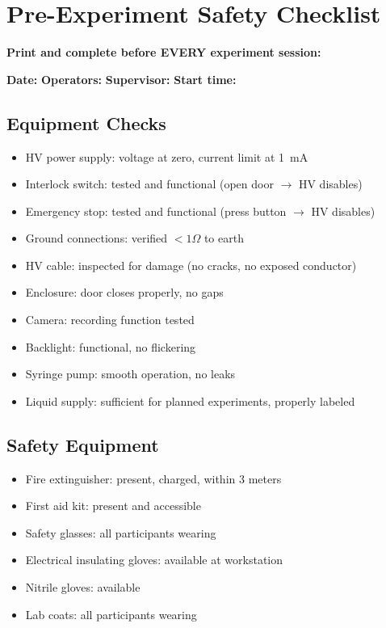 \documentclass[11pt]{article}
\begin{document}
\section{Pre-Experiment Safety Checklist}

\textbf{Print and complete before EVERY experiment session:}

\vspace{0.5cm}

\noindent\textbf{Date:} \underline{\hspace{3cm}}  
\textbf{Operators:} \underline{\hspace{10cm}}  
\textbf{Supervisor:} \underline{\hspace{4cm}}  
\textbf{Start time:} \underline{\hspace{2cm}}

\subsection{Equipment Checks}

\begin{itemize}
\item[$\square$] HV power supply: voltage at zero, current limit at 1~mA
\item[$\square$] Interlock switch: tested and functional (open door $\rightarrow$ HV disables)
\item[$\square$] Emergency stop: tested and functional (press button $\rightarrow$ HV disables)
\item[$\square$] Ground connections: verified $<1\Omega$ to earth
\item[$\square$] HV cable: inspected for damage (no cracks, no exposed conductor)
\item[$\square$] Enclosure: door closes properly, no gaps
\item[$\square$] Camera: recording function tested
\item[$\square$] Backlight: functional, no flickering
\item[$\square$] Syringe pump: smooth operation, no leaks
\item[$\square$] Liquid supply: sufficient for planned experiments, properly labeled
\end{itemize}

\subsection{Safety Equipment}

\begin{itemize}
\item[$\square$] Fire extinguisher: present, charged, within 3 meters
\item[$\square$] First aid kit: present and accessible
\item[$\square$] Safety glasses: all participants wearing
\item[$\square$] Electrical insulating gloves: available at workstation
\item[$\square$] Nitrile gloves: available
\item[$\square$] Lab coats: all participants wearing
\end{itemize}
\end{document}
